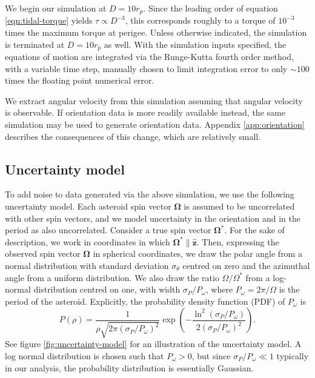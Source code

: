 \documentclass[fleqn,usenatbib]{mnras}
\newcommand{\unit}[1]{\bm{\hat{#1}}}
\newcommand{\parens}[1]{\left( #1 \right)}
\begin{document}
We begin our simulation at $D = 10 r_p$. Since the leading order of equation \ref{eqn:tidal-torque} yields $\tau \propto D^{-3}$, this corresponds roughly to a torque of $10^{-3}$ times the maximum torque at perigee. Unless otherwise indicated, the simulation is terminated at $D=10 r_p$ as well. With the simulation inputs specified, the equations of motion are integrated via the Runge-Kutta fourth order method, with a variable time step, manually chosen to limit integration error to only $\sim 100$ times the floating point numerical error.

We extract angular velocity from this simulation assuming that angular velocity is observable. If orientation data is more readily available instead, the same simulation may be used to generate orientation data. Appendix \ref{app:orientation} describes the consequences of this change, which are relatively small.



\subsection{Uncertainty model}
\label{sec:uncertainty}

To add noise to data generated via the above simulation, we use the following uncertainty model. Each asteroid spin vector $\bm \Omega$ is assumed to be uncorrelated with other spin vectors, and we model uncertainty in the orientation and in the period as also uncorrelated. Consider a true spin vector $\bm \Omega^*$. For the sake of description, we work in coordinates in which $\bm \Omega^* \parallel \unit z$. Then, expressing the observed spin vector $\bm \Omega$ in spherical coordinates, we draw the polar angle from a normal distribution with standard deviation $\sigma_\theta$ centred on zero and the azimuthal angle from a uniform distribution. We also draw the ratio $\Omega/\Omega^*$ from a log-normal distribution centred on one, with width $\sigma_P / P_\omega$, where $P_\omega = 2\pi / \Omega$ is the period of the asteroid. Explicitly, the probability density function (PDF) of $P_\omega$ is 
\begin{equation}
  P(\rho) = \frac{1}{\rho\sqrt{2\pi (\sigma_P / P_\omega)^2}} \exp\parens{-\frac{\ln^2(\sigma_P / P_\omega)}{2(\sigma_P / P_\omega)^2}}.
\end{equation}
See figure \ref{fig:uncertainty-model} for an illustration of the uncertainty model. A log normal distribution is chosen such that $P_\omega > 0$, but since $\sigma_P/P_\omega \ll 1$ typically in our analysis, the probability distribution is essentially Gaussian.
\end{document}
